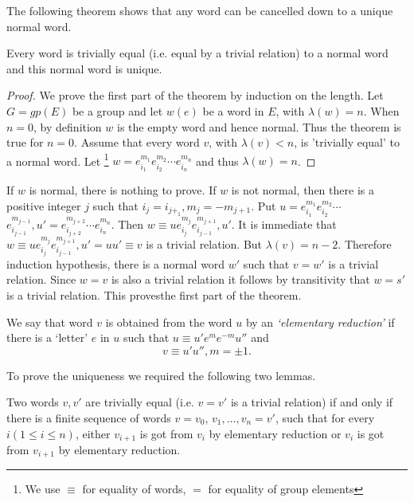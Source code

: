 The following theorem shows that any word can be cancelled down to a
unique normal word. 

\begin{theorem}\label{chap4:sec2:thm2}%
  Every word is trivially equal (i.e. equal by a trivial relation) to
  a normal word and this normal word is unique. 
\end{theorem}

\begin{proof}
  We prove the first part of the theorem by induction on the
  length. Let $G=gp(E)$ be a group and let $w(e)$ be a word in $E$,
  with $\lambda(w)=n$. When $n=0$, by definition $w$ is the empty word
  and hence normal. Thus the theorem is true for $n=0$. Assume that
  every word $v$, with $\lambda (v)<n$, is 'trivially equal' to a
  normal word. Let \footnote{We use $\equiv$ for equality of words,
    $=$ for equality of group elements}
  $w=e^{m_1}_{i_1}e^{m_2}_{i_2}\cdots e^{m_n}_{i_n}$ and thus $\lambda
  (w)=n$. 
\end{proof}

If $w$ is normal, there is nothing to prove. If $w$ is not normal,
then there is a positive integer $j$ such that
$i_j=i_{j+_1},m_j=-m_{j+1}$. Put $u=e^{m_1}_{i_1}e^{m_2}_{i_2}\cdots$ 
$e^{m_{j-1}}_{i_{j-1}}, u'=e^{m_{j+2}}_{i_{j+2}} \cdots
e^{m_n}_{i_n}$. Then $w \equiv
ue^{m_j}_{i_j}e^{m_{j+1}}_{i_{j-1}},u'$. It is immediate that $w
\equiv ue^{m_j}_{i_j}e^{m_{j+1}}_{i_{j-1}},u'=uu' \equiv v$ is a
trivial relation. But $\lambda (v)=n-2$. Therefore induction
hypothesis, there is a normal word $w'$ such that $v=w'$ is a trivial
relation. Since $w=v$ is also a trivial relation it follows by
transitivity that $w=s'$ is a trivial relation. This
proves\pageoriginale the first part of the theorem. 

We say that word $v$ is obtained from the word $u$ by an
\textit{`elementary reduction'} if there is a `letter' $e$ in $u$ such
that $u \equiv u'e^m e^{-m}u''$ and 
$$
v \equiv u' u'',m= \pm 1.
$$

To prove the uniqueness we required the following two lemmas.

\begin{lem}\label{chap4:sec2:lem1}%
  Two words $v,v'$ are trivially equal (i.e. $v=v'$ is a trivial
  relation) if and only if there is a finite sequence of words
  $v=v_0$, $v_1, \ldots, v_n=v'$, such that for every $i(1 \leq i \leq
  n)$, either $v_{i+1}$ is got from $v_i$ by elementary reduction or
  $v_i$ is got from $v_{i+1}$ by elementary reduction. 
\end{lem}


